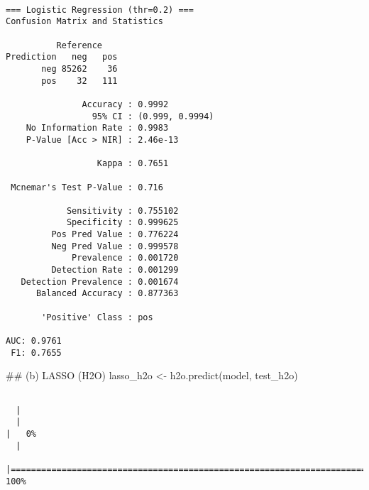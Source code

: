 \documentclass[
  11pt,
  letterpaper,
  DIV=11,
  numbers=noendperiod]{scrartcl}
\newenvironment{Shaded}{}{}
\newcommand{\DocumentationTok}[1]{\textcolor[rgb]{0.42,0.45,0.49}{#1}}
\newcommand{\FunctionTok}[1]{\textcolor[rgb]{0.44,0.26,0.76}{#1}}
\newcommand{\NormalTok}[1]{\textcolor[rgb]{0.14,0.16,0.18}{#1}}
\newcommand{\OtherTok}[1]{\textcolor[rgb]{0.44,0.26,0.76}{#1}}
\newcommand{\SpecialCharTok}[1]{\textcolor[rgb]{0.00,0.36,0.77}{#1}}
\newcommand{\StringTok}[1]{\textcolor[rgb]{0.01,0.18,0.38}{#1}}
\begin{document}
\begin{verbatim}

=== Logistic Regression (thr=0.2) ===
Confusion Matrix and Statistics

          Reference
Prediction   neg   pos
       neg 85262    36
       pos    32   111
                                         
               Accuracy : 0.9992         
                 95% CI : (0.999, 0.9994)
    No Information Rate : 0.9983         
    P-Value [Acc > NIR] : 2.46e-13       
                                         
                  Kappa : 0.7651         
                                         
 Mcnemar's Test P-Value : 0.716          
                                         
            Sensitivity : 0.755102       
            Specificity : 0.999625       
         Pos Pred Value : 0.776224       
         Neg Pred Value : 0.999578       
             Prevalence : 0.001720       
         Detection Rate : 0.001299       
   Detection Prevalence : 0.001674       
      Balanced Accuracy : 0.877363       
                                         
       'Positive' Class : pos            
                                         
AUC: 0.9761 
 F1: 0.7655 
\end{verbatim}

\begin{Shaded}
\begin{Highlighting}[]
\DocumentationTok{\#\# (b) LASSO (H2O)}
\NormalTok{lasso\_h2o  }\OtherTok{\textless{}{-}} \FunctionTok{h2o.predict}\NormalTok{(model, test\_h2o)}
\end{Highlighting}
\end{Shaded}

\begin{verbatim}

  |                                                                            
  |                                                                      |   0%
  |                                                                            
  |======================================================================| 100%
\end{verbatim}

\begin{Shaded}
\end{Shaded}
\end{document}
